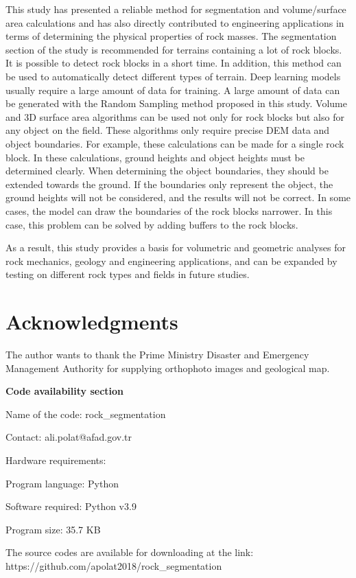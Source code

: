 \documentclass[a4paper,fleqn]{cas-sc}
\begin{document}
This study has presented a reliable method for segmentation and volume/surface area calculations and has also directly contributed to engineering applications in terms of determining the physical properties of rock masses. The segmentation section of the study is recommended for terrains containing a lot of rock blocks. It is possible to detect rock blocks in a short time. In addition, this method can be used to automatically detect different types of terrain. Deep learning models usually require a large amount of data for training. A large amount of data can be generated with the Random Sampling method proposed in this study. Volume and 3D surface area algorithms can be used not only for rock blocks but also for any object on the field. These algorithms only require precise DEM data and object boundaries. For example, these calculations can be made for a single rock block. In these calculations, ground heights and object heights must be determined clearly. When determining the object boundaries, they should be extended towards the ground. If the boundaries only represent the object, the ground heights will not be considered, and the results will not be correct. In some cases, the model can draw the boundaries of the rock blocks narrower. In this case, this problem can be solved by adding buffers to the rock blocks.

As a result, this study provides a basis for volumetric and geometric analyses for rock mechanics, geology and engineering applications, and can be expanded by testing on different rock types and fields in future studies.


\section{Acknowledgments}

The author wants to thank the Prime Ministry Disaster and Emergency Management Authority for supplying orthophoto images and geological map.

\newpage

\textbf{Code availability section}

Name of the code: rock\_segmentation

Contact: ali.polat@afad.gov.tr

Hardware requirements: 

Program language: Python
 
Software required: Python v3.9

Program size: 35.7 KB

The source codes are available for downloading at the link:
https://github.com/apolat2018/rock\_segmentation



 
\end{document}
